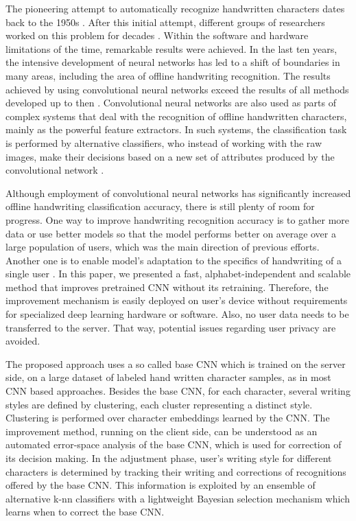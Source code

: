 \documentclass{article}
\begin{document}
The pioneering attempt to automatically recognize handwritten characters dates back to the 1950s \citep{leedham}.
After this initial attempt, different groups of researchers worked on this problem for decades \citep{hist1, hist2, hist3, hist4, hist5, plamondon}. 
Within the software and hardware limitations of the time, remarkable results were achieved.
In the last ten years, the intensive development of neural networks has led to a shift of boundaries in many areas,
including the area of offline handwriting recognition.
The results achieved by using convolutional neural networks exceed the results of all methods developed up to then \citep{cnnbest1, cnnbest3, cnnbest4, cnnbest2, cnnbest5}. 
Convolutional neural networks are also used as parts of complex systems that deal with the recognition of offline handwritten characters,
mainly as the powerful feature extractors. 
In such systems, the classification task is performed by alternative classifiers, who instead of working with the raw images, 
make their decisions based on a new set of attributes produced by the convolutional network \citep{cnnrelated1,cnnrelated2,cnnrelated3}. 

Although employment of convolutional neural networks has significantly increased offline handwriting classification accuracy, there is still plenty of room for progress. 
One way to improve handwriting recognition accuracy is to gather more data \citep{augment1, augment} or use better models so that the model performs better on average over a large population of users, 
which was the main direction of previous efforts. Another one is to enable model's adaptation to the specifics of handwriting of a single user
\citep{custom3, custom2, custom1, nist5, custom4, custom5}. 
In this paper, we presented a fast, alphabet-independent and scalable method that improves pretrained CNN without its retraining. Therefore, the improvement mechanism is easily deployed on user's device without requirements for specialized deep learning hardware or software. Also, no user data needs to be
transferred to the server. That way, potential issues regarding user privacy are avoided.
  
The proposed approach uses a so called base CNN which is trained on the server side, on a large dataset of labeled hand written character samples, as in most CNN based approaches. Besides the base CNN, for each character, several writing styles are defined by clustering, each cluster representing a distinct style. Clustering is performed over character embeddings learned by the CNN. The improvement method, running on the client side, can be understood as an automated error-space analysis of the base CNN, which is used for correction of its decision making. In the adjustment phase, user's writing style for different characters is determined by tracking their writing and corrections of recognitions offered by the base CNN. This information is exploited by an ensemble of alternative k-nn classifiers with a lightweight Bayesian selection mechanism which learns when to correct the base CNN.
\end{document}
